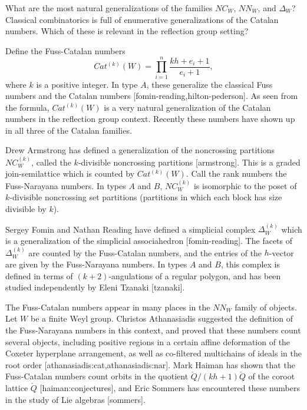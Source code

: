 \documentclass[12pt,letterpaper, reqno]{amsart}
\begin{document}
\begin{problemblock}

\begin{problem}[1.4]
What are the most natural generalizations of the families $NC_W$, $NN_W$, and $\Delta_W$? Classical combinatorics is full of enumerative generalizations of the Catalan numbers. Which of these is relevant in the reflection group setting?
\end{problem}

\begin{distinguishedremark}
Define the Fuss-Catalan numbers
$$
Cat^{(k)}(W)= \prod_{i=1}^n \frac{kh+e_i+1}{e_i+1},
$$
where $k$ is a positive integer. In type $A$, these generalize the classical Fuss numbers and the Catalan numbers [fomin-reading,hilton-pederson]. As seen from the formula, $Cat^{(k)}(W)$ is a very natural generalization of the Catalan numbers in the reflection group context. Recently these numbers  have shown up in all three of the Catalan families.
\end{distinguishedremark}

\begin{remark}
Drew Armstrong has defined a generalization of the noncrossing partitions $NC_W^{(k)}$, called the $k$-divisible noncrossing partitions [armstrong]. This is a graded join-semilattice which is counted by $Cat^{(k)}(W)$. Call the rank numbers the Fuss-Narayana numbers. In types $A$ and $B$, $NC_W^{(k)}$ is isomorphic to the poset of $k$-divisible noncrossing set partitions (partitions in which each block has size divisible by $k$).
\end{remark}

\begin{remark}
Sergey Fomin and Nathan Reading have defined a simplicial complex $\Delta^{(k)}_W$ which is a generalization of the simplicial associahedron [fomin-reading]. The facets of $\Delta^{(k)}_W$ are counted by the Fuss-Catalan numbers, and the entries of the $h$-vector are given by the Fuss-Narayana numbers. In types $A$ and $B$, this complex is defined in terms of $(k+2)$-angulations of a regular polygon, and has been studied independently by Eleni Tzanaki [tzanaki].
\end{remark}

\begin{remark}
The Fuss-Catalan numbers appear in many places in the $NN_W$ family of objects. Let $W$ be a finite Weyl group. Christos Athanasiadis suggested the definition of the Fuss-Narayana numbers in this context, and proved that these numbers count several objects, including positive regions in a certain affine deformation of the Coxeter hyperplane arrangement, as well as co-filtered multichains of ideals in the root order [athanasiadis:cat,athanasiadis:nar]. Mark Haiman has shown that the Fuss-Catalan numbers count orbits in the quotient $\check{Q}/(kh+1)\check{Q}$ of the coroot lattice $\check{Q}$ [haiman:conjectures], and Eric Sommers has encountered these numbers in the study of Lie algebras [sommers].
\end{remark}
\end{problemblock}
\end{document}
